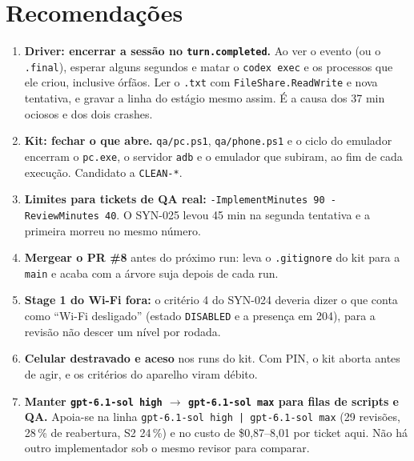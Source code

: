 \documentclass[11pt,a4paper]{article}
\begin{document}
\section{Recomendações}
\begin{enumerate}
  \item \textbf{Driver: encerrar a sessão no \texttt{turn.completed}.} Ao ver
        o evento (ou o \texttt{.final}), esperar alguns segundos e matar o
        \texttt{codex exec} e os processos que ele criou, inclusive órfãos.
        Ler o \texttt{.txt} com \texttt{FileShare.ReadWrite} e nova tentativa,
        e gravar a linha do estágio mesmo assim. É a causa dos 37 min ociosos e
        dos dois crashes.
  \item \textbf{Kit: fechar o que abre.} \texttt{qa/pc.ps1},
        \texttt{qa/phone.ps1} e o ciclo do emulador encerram o \texttt{pc.exe},
        o servidor \texttt{adb} e o emulador que subiram, ao fim de cada
        execução. Candidato a \texttt{CLEAN-*}.
  \item \textbf{Limites para tickets de QA real:} \texttt{-ImplementMinutes 90
        -ReviewMinutes 40}. O SYN-025 levou 45 min na segunda tentativa e a
        primeira morreu no mesmo número.
  \item \textbf{Mergear o PR \#8} antes do próximo run: leva o
        \texttt{.gitignore} do kit para a \texttt{main} e acaba com a árvore
        suja depois de cada run.
  \item \textbf{Stage 1 do Wi-Fi fora:} o critério 4 do SYN-024 deveria dizer
        o que conta como ``Wi-Fi desligado'' (estado \texttt{DISABLED} e a
        presença em 204), para a revisão não descer um nível por rodada.
  \item \textbf{Celular destravado e aceso} nos runs do kit. Com PIN, o kit
        aborta antes de agir, e os critérios do aparelho viram débito.
  \item \textbf{Manter \texttt{gpt-6.1-sol high} $\to$ \texttt{gpt-6.1-sol max}
        para filas de scripts e QA.} Apoia-se na linha \texttt{gpt-6.1-sol high
        | gpt-6.1-sol max} (29 revisões, 28\,\% de reabertura, S2 24\,\%) e no
        custo de \$0,87--8,01 por ticket aqui. Não há outro implementador sob o
        mesmo revisor para comparar.
\end{enumerate}
\end{document}
